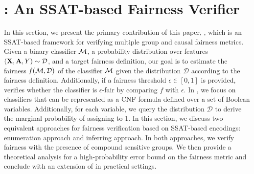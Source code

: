 \section{{\justicia}: An SSAT-based Fairness Verifier}
\label{fairness_justicia_sec:framework}
In this section, we present the primary contribution of this paper, {\justicia}, which is an SSAT-based framework for verifying multiple group and causal fairness metrics. Given a binary classifier $\alg$, a probability distribution over features $(\mathbf{X},\mathbf{A},Y) \sim \mathcal{D} $, and a target fairness definition, our goal is to estimate the fairness $ f(\mathcal{M}, \mathcal{D}) $ of the classifier $ \alg $ given the distribution $ \mathcal{D} $ according to the fairness definition. Additionally, if a fairness threshold $ \epsilon \in [0,1] $ is provided, {\justicia} verifies whether the classifier is $ \epsilon $-fair by comparing $ f $ with $ \epsilon $. In {\justicia}, we focus on classifiers that can be represented as a CNF formula defined over a set of Boolean variables. Additionally, for each variable, we query the distribution $ \mathcal{D} $ to derive the marginal probability of assigning to $ 1 $. In this section, we discuss two equivalent approaches for fairness verification based on SSAT-based encodings: enumeration approach and inferring approach. In both approaches, we verify fairness with the presence of compound sensitive groups.  We then provide a theoretical analysis for a high-probability error bound on the fairness metric and conclude with an extension of {\justicia} in practical settings.




\iffalse
In this section, we present the main contribution of this paper, {\justicia}, which is an SSAT framework for verifying independence and separation metrics of fairness. 
We first state the problem formally in Section~\ref{fairness_justicia_sec:problem_statement}. 
To verify fairness metrics in compound sensitive groups, we discuss an enumeration approach in Section~\ref{fairness_justicia_sec:enumeration_ssat} and an equivalent but more efficient learning approach in Section~\ref{fairness_justicia_sec:learn_ssat}. 
We conclude this section by proposing a conditional distribution based enumeration for compound sensitive groups in Section~\ref{fairness_justicia_sec:cond_ssat}. 


\subsection{Problem Statement}
\label{fairness_justicia_sec:problem_statement}
Given a binary classifier $\alg$ and a probability distribution over dataset $(X,A,Y) \sim \mathcal{D} $, our goal is to verify whether $\alg$ achieves independence and separation metrics with respect to the distribution $\mathcal{D}$. We  focus on a classifier that can be translated to a CNF formula of Boolean variables $\mathbf{B} $. 
The probability $ p_i $ of $\bool_i \in \mathbf{B}$ being assigned to $1$ is induced by the data generating distribution $\mathcal{D}$. 
In our contribution, we reduce the verification problem to solving appropriately designed SSAT instances.
\fi 

